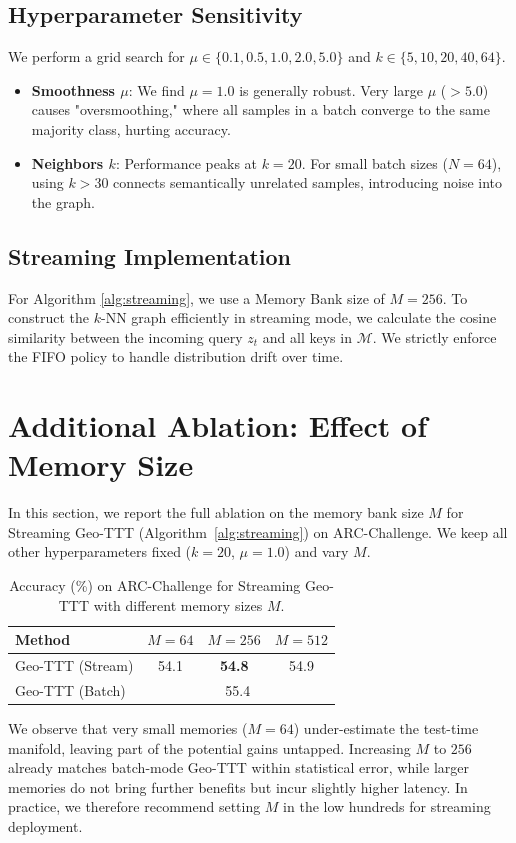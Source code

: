 \documentclass{article}
\theoremstyle{plain}
\theoremstyle{definition}
\theoremstyle{remark}
\begin{document}
\subsection{Hyperparameter Sensitivity}
We perform a grid search for $\mu \in \{0.1, 0.5, 1.0, 2.0, 5.0\}$ and $k \in \{5, 10, 20, 40, 64\}$.
\begin{itemize}
    \item \textbf{Smoothness $\mu$}: We find $\mu=1.0$ is generally robust. Very large $\mu$ ($>5.0$) causes "oversmoothing," where all samples in a batch converge to the same majority class, hurting accuracy.
    \item \textbf{Neighbors $k$}: Performance peaks at $k=20$. For small batch sizes ($N=64$), using $k > 30$ connects semantically unrelated samples, introducing noise into the graph.
\end{itemize}

\subsection{Streaming Implementation}
For Algorithm \ref{alg:streaming}, we use a Memory Bank size of $M=256$. To construct the $k$-NN graph efficiently in streaming mode, we calculate the cosine similarity between the incoming query $z_t$ and all keys in $\mathcal{M}$. We strictly enforce the FIFO policy to handle distribution drift over time.

\section{Additional Ablation: Effect of Memory Size}
\label{app:memory}

In this section, we report the full ablation on the memory bank size $M$ for Streaming Geo-TTT (Algorithm~\ref{alg:streaming}) on ARC-Challenge. We keep all other hyperparameters fixed ($k=20$, $\mu=1.0$) and vary $M$.

\begin{table}[h]
\centering
\caption{Accuracy (\%) on ARC-Challenge for Streaming Geo-TTT with different memory sizes $M$.}
\label{tab:memory}
\vspace{0.1cm}
\begin{tabular}{lccc}
\toprule
Method & $M=64$ & $M=256$ & $M=512$ \\
\midrule
Geo-TTT (Stream) & 54.1 & \textbf{54.8} & 54.9 \\
Geo-TTT (Batch)  & \multicolumn{3}{c}{55.4} \\
\bottomrule
\end{tabular}
\end{table}

We observe that very small memories ($M=64$) under-estimate the test-time manifold, leaving part of the potential gains untapped. Increasing $M$ to $256$ already matches batch-mode Geo-TTT within statistical error, while larger memories do not bring further benefits but incur slightly higher latency. In practice, we therefore recommend setting $M$ in the low hundreds for streaming deployment.
\end{document}
